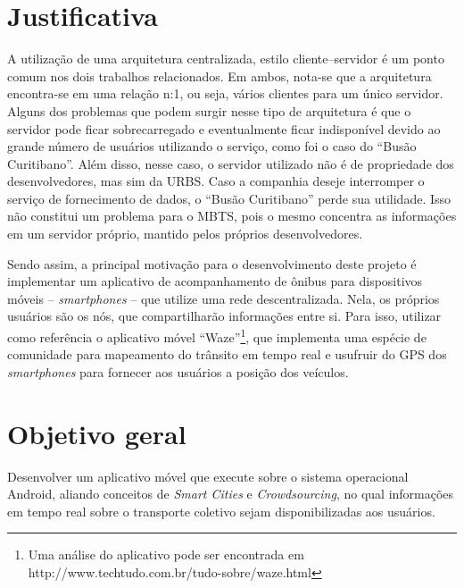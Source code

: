 \section{Justificativa}

A utilização de uma arquitetura centralizada, estilo cliente--servidor é um ponto comum nos dois trabalhos relacionados. Em ambos, nota-se que a arquitetura encontra-se em uma relação n:1, ou seja, vários clientes para um único servidor. Alguns dos problemas que podem surgir nesse tipo de arquitetura é que o servidor pode ficar sobrecarregado e eventualmente ficar indisponível devido ao grande número de usuários utilizando o serviço, como foi o caso do ``Busão Curitibano''. Além disso, nesse caso, o servidor utilizado não é de propriedade dos desenvolvedores, mas sim da URBS. Caso a companhia deseje interromper o serviço de fornecimento de dados, o ``Busão Curitibano'' perde sua utilidade. Isso não constitui um problema para o MBTS, pois o mesmo concentra as informações em um servidor próprio, mantido pelos próprios desenvolvedores.

Sendo assim, a principal motivação para o desenvolvimento deste projeto é implementar um aplicativo de acompanhamento de ônibus para dispositivos móveis -- \textit{smartphones} -- que utilize uma rede descentralizada. Nela, os próprios usuários são os nós, que compartilharão informações entre si. Para isso, utilizar como referência o aplicativo móvel ``Waze''\footnote{Uma análise do aplicativo pode ser encontrada em http://www.techtudo.com.br/tudo-sobre/waze.html}, que implementa uma espécie de comunidade para mapeamento do trânsito em tempo real e usufruir do GPS dos \textit{smartphones} para fornecer aos usuários a posição dos veículos.

\section{Objetivo geral}

Desenvolver um aplicativo móvel que execute sobre o sistema operacional Android, aliando conceitos de \textit{Smart Cities}
e \textit{Crowdsourcing}, no qual informações em tempo real sobre o transporte coletivo sejam disponibilizadas aos usuários.


